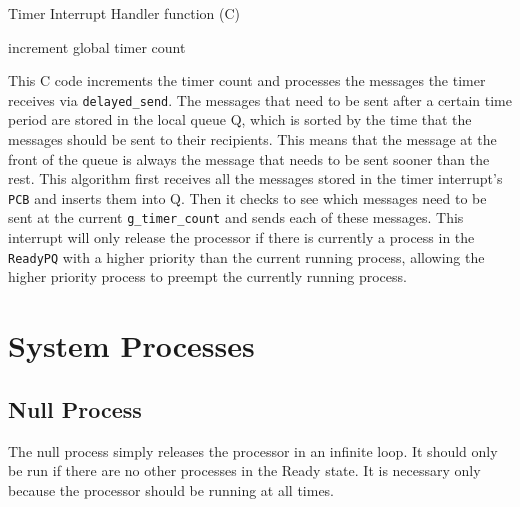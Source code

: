 \documentclass[12pt]{report}
\begin{document}
\begin{algorithm}[H]
	\caption{Timer Interrupt Handler function (C)}
	\begin{algorithmic}[1]
	    \State increment global timer count
			\EndIf
		\EndWhile
		\EndWhile
		\EndIf
	  \EndFunction
	\end{algorithmic}
\end{algorithm}

This C code increments the timer count and processes the messages the timer receives via \texttt{delayed\_send}.  The messages that need to be sent after a certain time period are stored in the local queue Q, which is sorted by the time that the messages should be sent to their recipients.  This means that the message at the front of the queue is always the message that needs to be sent sooner than the rest.  This algorithm first receives all the messages stored in the timer interrupt's \texttt{PCB} and inserts them into Q.  Then it checks to see which messages need to be sent at the current \texttt{g_timer_count} and sends each of these messages.  This interrupt will only release the processor if there is currently a process in the \texttt{ReadyPQ} with a higher priority than the current running process, allowing the higher priority process to preempt the currently running process.


\section{System Processes}

\subsection{Null Process}

The null process simply releases the processor in an infinite loop.  It should only be run if there are no other processes in the Ready state.  It is necessary only because the processor should be running at all times.
\end{document}
